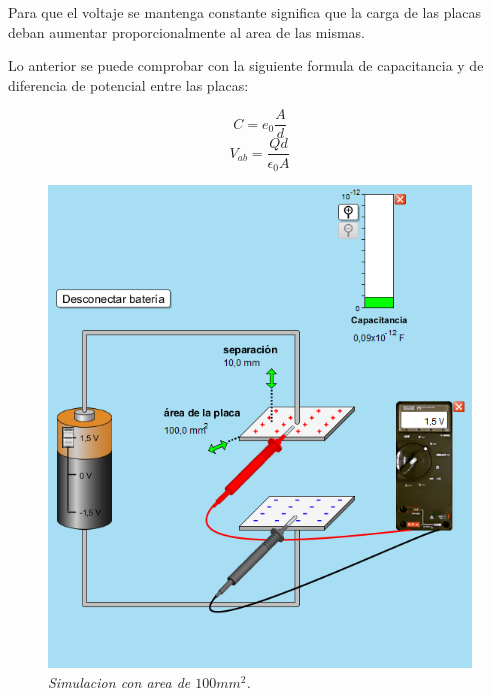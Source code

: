 \documentclass[12pt]{report}
\begin{document}
\begin{enumerate}
    Para que el voltaje se mantenga  constante significa que la carga de las placas deban aumentar  proporcionalmente al area de las mismas.

Lo anterior se puede comprobar con la siguiente formula de capacitancia y de diferencia de potencial entre las placas:
    \begin{center}
    \[C=e_0\frac{A}{d}\]
    \[V_{ab}=\frac{Qd}{\epsilon_0A}\]
    \end{center}

    \begin{figure}[h]
        \centering
        \begin{minipage}[h]{0.45\textwidth}
        \centering
        \includegraphics[width=1\textwidth]{./images/1FOTO3.png}
        \textit{Simulacion con area de \(100mm^2\).} 
        \end{minipage}\hskip 1cm
        \begin{minipage}[h]{0.45\textwidth}
        \centering

\end{minipage}
\end{figure}
\end{enumerate}
\end{document}
